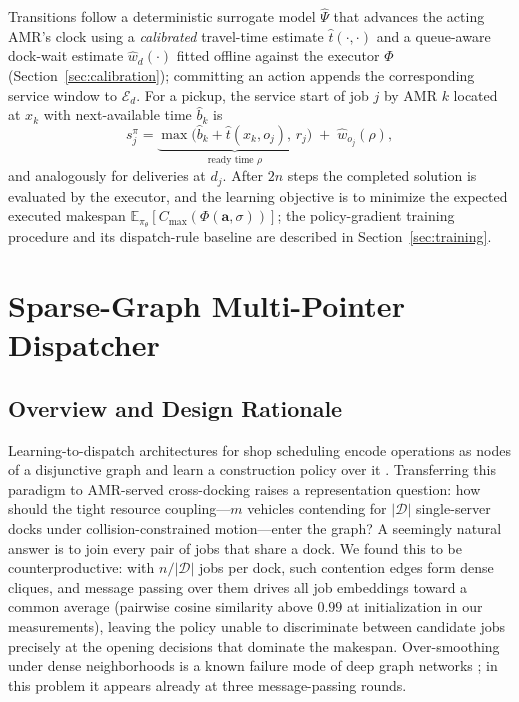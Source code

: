 Transitions follow a deterministic surrogate model $\hat{\Psi}$ that
advances the acting AMR's clock using a \emph{calibrated} travel-time
estimate $\hat{t}(\cdot,\cdot)$ and a queue-aware dock-wait estimate
$\hat{w}_d(\cdot)$ fitted offline against the executor $\Phi$
(Section~\ref{sec:calibration}); committing an action appends the
corresponding service window to $\mathcal{E}_d$. For a pickup, the
service start of job $j$ by AMR $k$ located at $x_k$ with next-available
time $\hat{b}_k$ is
\begin{equation}
s^{\pi}_j=\underbrace{\max\!\big(\hat{b}_k+\hat{t}(x_k,o_j),\, r_j\big)}_{\text{ready time }\rho}
\;+\;\hat{w}_{o_j}(\rho),
\label{eq:surrogate}
\end{equation}
and analogously for deliveries at $d_j$. After $2n$ steps the completed
solution is evaluated by the executor, and the learning objective is to
minimize the expected executed makespan
$\mathbb{E}_{\pi_\theta}\!\left[C_{\max}(\Phi(\bm{a},\sigma))\right]$;
the policy-gradient training procedure and its dispatch-rule baseline
are described in Section~\ref{sec:training}.


\section{Sparse-Graph Multi-Pointer Dispatcher}
\label{sec:architecture}

\subsection{Overview and Design Rationale}

Learning-to-dispatch architectures for shop scheduling encode
operations as nodes of a disjunctive graph and learn a construction
policy over it \cite{zhang2020l2d,song2023fjsp}. Transferring this
paradigm to AMR-served cross-docking raises a representation question:
how should the tight resource coupling---$m$ vehicles contending for
$|\mathcal{D}|$ single-server docks under collision-constrained
motion---enter the graph? A seemingly natural answer is to join every
pair of jobs that share a dock. We found this to be
counterproductive: with $n/|\mathcal{D}|$ jobs per dock, such
contention edges form dense cliques, and message passing over them
drives all job embeddings toward a common average (pairwise cosine
similarity above $0.99$ at initialization in our measurements),
leaving the policy unable to discriminate between candidate jobs
precisely at the opening decisions that dominate the makespan.
Over-smoothing under dense neighborhoods is a known failure mode of
deep graph networks \cite{li2018deeper,oono2020oversmoothing}; in this
problem it appears already at three message-passing rounds.

